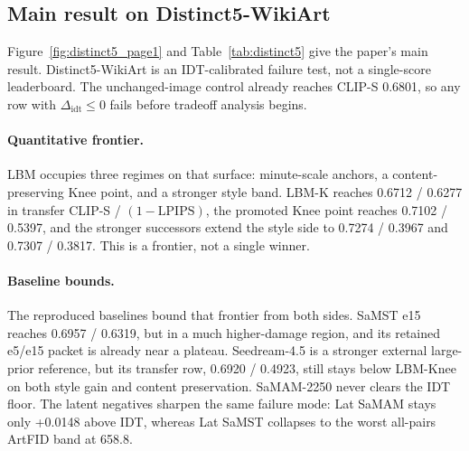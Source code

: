 \documentclass[letterpaper]{article}
\begin{document}
\subsection{Main result on Distinct5-WikiArt}
Figure~\ref{fig:distinct5_page1} and Table~\ref{tab:distinct5} give the paper's main result. Distinct5-WikiArt is an IDT-calibrated failure test, not a single-score leaderboard. The unchanged-image control already reaches CLIP-S 0.6801, so any row with $\Delta_{\mathrm{idt}}\le 0$ fails before tradeoff analysis begins.

\paragraph{Quantitative frontier.}
LBM occupies three regimes on that surface: minute-scale anchors, a content-preserving Knee point, and a stronger style band. LBM-K reaches 0.6712 / 0.6277 in transfer CLIP-S / $(1-\mathrm{LPIPS})$, the promoted Knee point reaches 0.7102 / 0.5397, and the stronger successors extend the style side to 0.7274 / 0.3967 and 0.7307 / 0.3817. This is a frontier, not a single winner.

\paragraph{Baseline bounds.}
The reproduced baselines bound that frontier from both sides. SaMST e15 reaches 0.6957 / 0.6319, but in a much higher-damage region, and its retained e5/e15 packet is already near a plateau. Seedream-4.5 is a stronger external large-prior reference, but its transfer row, 0.6920 / 0.4923, still stays below LBM-Knee on both style gain and content preservation. SaMAM-2250 never clears the IDT floor. The latent negatives sharpen the same failure mode: Lat SaMAM stays only +0.0148 above IDT, whereas Lat SaMST collapses to the worst all-pairs ArtFID band at 658.8.
\end{document}
